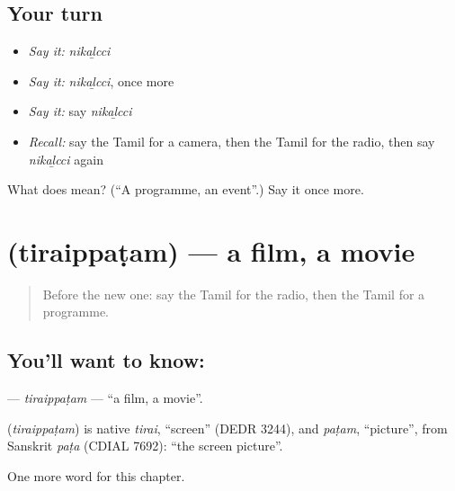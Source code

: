 \subsection*{Your turn}
\begin{itemize}
\raggedright
  \item \emph{Say it:} \emph{nikaḻcci}
  \item \emph{Say it:} \emph{nikaḻcci}, once more
  \item \emph{Say it:} say \emph{nikaḻcci}
  \item \emph{Recall:} say the Tamil for a camera, then the Tamil for the radio, then say \emph{nikaḻcci} again
\end{itemize}

\begin{tcolorbox}[breakable,colback=teal!4,colframe=teal!35!black,title={Before you move on}]
What does  mean? (\textquotedblleft{}A programme, an event\textquotedblright{}.) Say it once more.
\end{tcolorbox}
\section[\texorpdfstring{\ta{திரைப்படம்} (tiraippaṭam)}{திரைப்படம் (tiraippaṭam)}]{ (tiraippaṭam) — a film, a movie}

\label{lesson:TA-C220-tiraippatam}



\begin{quote}
Before the new one: say the Tamil for the radio, then the Tamil for a programme.
\end{quote}

\subsection*{You'll want to know: }
\textbf{} — \emph{tiraippaṭam} — \textquotedblleft{}a film, a movie\textquotedblright{}.

\begin{cousinweb}
\textbf{} (\emph{tiraippaṭam}) is native \emph{tirai}, \textquotedblleft{}screen\textquotedblright{} (DEDR 3244), and \emph{paṭam}, \textquotedblleft{}picture\textquotedblright{}, from Sanskrit \emph{paṭa} (CDIAL 7692): \textquotedblleft{}the screen picture\textquotedblright{}.
\end{cousinweb}

\begin{grammarlens}[title={What you've built}]
One more word for this chapter.
\end{grammarlens}

